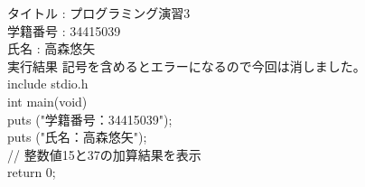 \documentclass{jsarticle}
\begin{document}
タイトル : プログラミング演習3\\
学籍番号 : 34415039\\
氏名 : 高森悠矢\\
実行結果 記号を含めるとエラーになるので今回は消しました。\\
include stdio.h\\
int main(void)\\
{
puts ("学籍番号：34415039");\\
puts ("氏名：高森悠矢");\\
// 整数値15と37の加算結果を表示\\
return 0; }\\
\end{document}
